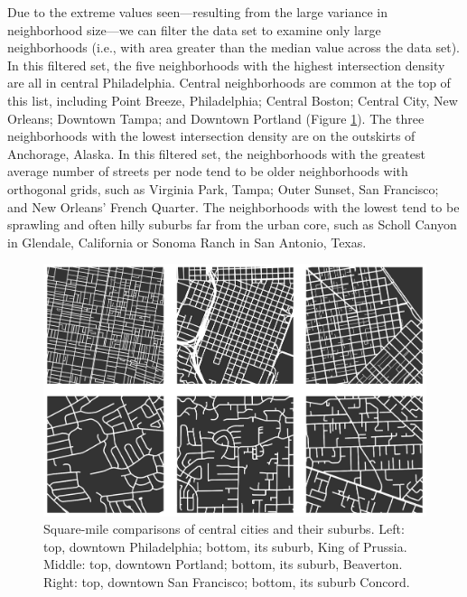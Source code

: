 \documentclass[Afour,sageh,times]{sage/sagej}
\begin{document}
Due to the extreme values seen---resulting from the large variance in neighborhood size---we can filter the data set to examine only large neighborhoods (i.e., with area greater than the median value across the data set). In this filtered set, the five neighborhoods with the highest intersection density are all in central Philadelphia. Central neighborhoods are common at the top of this list, including Point Breeze, Philadelphia; Central Boston; Central City, New Orleans; Downtown Tampa; and Downtown Portland (Figure \ref{fig05}). The three neighborhoods with the lowest intersection density are on the outskirts of Anchorage, Alaska. In this filtered set, the neighborhoods with the greatest average number of streets per node tend to be older neighborhoods with orthogonal grids, such as Virginia Park, Tampa; Outer Sunset, San Francisco; and New Orleans' French Quarter. The neighborhoods with the lowest tend to be sprawling and often hilly suburbs far from the urban core, such as Scholl Canyon in Glendale, California or Sonoma Ranch in San Antonio, Texas.

\begin{figure}[h]
	\includegraphics[width=1\textwidth]{media/fig05.png}
	\caption{Square-mile comparisons of central cities and their suburbs. Left: top, downtown Philadelphia; bottom, its suburb, King of Prussia. Middle: top, downtown Portland; bottom, its suburb, Beaverton. Right: top, downtown San Francisco; bottom, its suburb Concord.}
	\label{fig05}
\end{figure}
\end{document}
